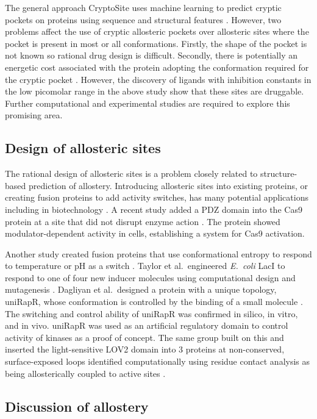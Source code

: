 The general approach CryptoSite uses machine learning to predict cryptic pockets on proteins using sequence and structural features \cite{Cimermancic2016}.
However, two problems affect the use of cryptic allosteric pockets over allosteric sites where the pocket is present in most or all conformations.
Firstly, the shape of the pocket is not known so rational drug design is difficult.
Secondly, there is potentially an energetic cost associated with the protein adopting the conformation required for the cryptic pocket \cite{Oleinikovas2016}.
However, the discovery of ligands with inhibition constants in the low picomolar range in the above study \cite{Lee2016} show that these sites are druggable.
Further computational and experimental studies are required to explore this promising area.


\subsection{Design of allosteric sites}

The rational design of allosteric sites is a problem closely related to structure-based prediction of allostery.
Introducing allosteric sites into existing proteins, or creating fusion proteins to add activity switches, has many potential applications including in biotechnology \cite{Makhlynets2015}.
A recent study added a PDZ domain into the Cas9 protein at a site that did not disrupt enzyme action \cite{Oakes2016}.
The protein showed modulator-dependent activity in cells, establishing a system for Cas9 activation.

Another study created fusion proteins that use conformational entropy to respond to temperature or pH as a switch \cite{Choi2015}.
Taylor et al.\ engineered \textit{E.\ coli} LacI to respond to one of four new inducer molecules using computational design and mutagenesis \cite{Taylor2016}.
Dagliyan et al.\ designed a protein with a unique topology, uniRapR, whose conformation is controlled by the binding of a small molecule \cite{Dagliyan2013}.
The switching and control ability of uniRapR was confirmed in silico, in vitro, and in vivo.
uniRapR was used as an artificial regulatory domain to control activity of kinases as a proof of concept.
The same group built on this and inserted the light-sensitive LOV2 domain into 3 proteins at non-conserved, surface-exposed loops identified computationally using residue contact analysis as being allosterically coupled to active sites \cite{Dagliyan2016}.


\subsection{Discussion of allostery}

